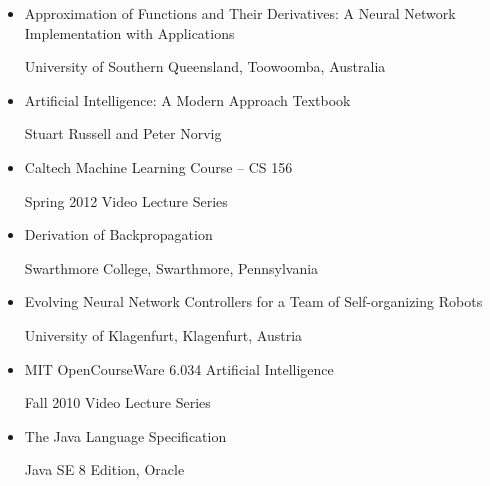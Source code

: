 \documentclass[letterpaper, 10pt]{article}
\begin{document}
	\begin{itemize}
		\item Approximation of Functions and Their Derivatives: A Neural Network Implementation with Applications
		
			\hspace{1.5cm} University of Southern Queensland, Toowoomba, Australia
		\item Artificial Intelligence: A Modern Approach Textbook
			
			\hspace{1.5cm} Stuart Russell and Peter Norvig
		\item Caltech Machine Learning Course -- CS 156
		
			\hspace{1.5cm} Spring 2012 Video Lecture Series
		\item Derivation of Backpropagation
		
			\hspace{1.5cm} Swarthmore College, Swarthmore, Pennsylvania
		\item Evolving Neural Network Controllers for a Team of Self-organizing Robots
		
			\hspace{1.5cm} University of Klagenfurt, Klagenfurt, Austria	
		\item MIT OpenCourseWare 6.034 Artificial Intelligence
		
			\hspace{1.5cm} Fall 2010 Video Lecture Series				
		\item The Java Language Specification
			
			\hspace{1.5cm} Java SE 8 Edition, Oracle
	\end{itemize}
\end{document}
